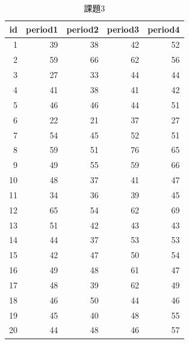 \begin{table}[ht]
	\centering
	\caption{課題3}
	\begin{tabular}{r|rrrr}
		\hline
		id & period1 & period2 & period3 & period4 \\
		\hline
		1  & 39      & 38      & 42      & 52      \\
		2  & 59      & 66      & 62      & 56      \\
		3  & 27      & 33      & 44      & 44      \\
		4  & 41      & 38      & 41      & 42      \\
		5  & 46      & 46      & 44      & 51      \\
		6  & 22      & 21      & 37      & 27      \\
		7  & 54      & 45      & 52      & 51      \\
		8  & 59      & 51      & 76      & 65      \\
		9  & 49      & 55      & 59      & 66      \\
		10 & 48      & 37      & 41      & 47      \\
		11 & 34      & 36      & 39      & 45      \\
		12 & 65      & 54      & 62      & 69      \\
		13 & 51      & 42      & 43      & 43      \\
		14 & 44      & 37      & 53      & 53      \\
		15 & 42      & 47      & 50      & 54      \\
		16 & 49      & 48      & 61      & 47      \\
		17 & 48      & 39      & 62      & 49      \\
		18 & 46      & 50      & 44      & 46      \\
		19 & 45      & 40      & 48      & 55      \\
		20 & 44      & 48      & 46      & 57      \\
		\hline
	\end{tabular}
	\label{L23::exe3}
\end{table}
